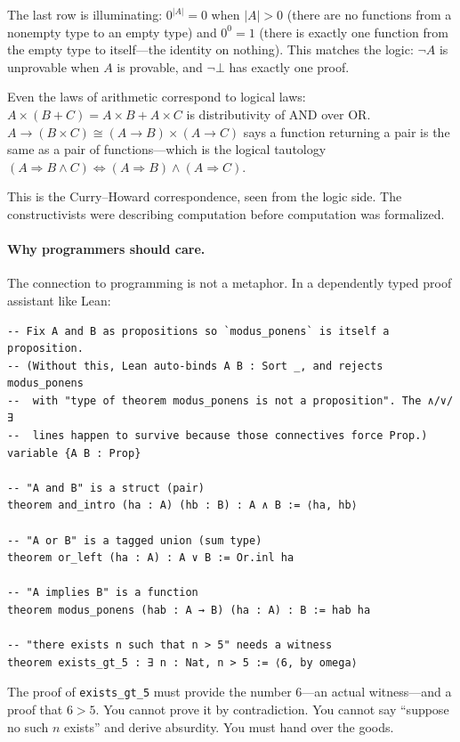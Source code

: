 \documentclass[11pt,a4paper]{article}
\theoremstyle{definition}
\begin{document}
The last row is illuminating: $0^{|A|} = 0$ when $|A| > 0$ (there are no
functions from a nonempty type to an empty type) and $0^0 = 1$ (there is
exactly one function from the empty type to itself---the identity on nothing).
This matches the logic: $\lnot A$ is unprovable when $A$ is provable, and
$\lnot \bot$ has exactly one proof.

Even the laws of arithmetic correspond to logical laws: $A \times (B + C) =
A \times B + A \times C$ is distributivity of AND over OR. $A \to (B \times C)
\cong (A \to B) \times (A \to C)$ says a function returning a pair is the same
as a pair of functions---which is the logical tautology
$(A \Rightarrow B \land C) \Leftrightarrow (A \Rightarrow B) \land
(A \Rightarrow C)$.

This is the Curry--Howard correspondence, seen from the logic side. The
constructivists were describing computation before computation was formalized.

\paragraph{Why programmers should care.}
The connection to programming is not a metaphor. In a dependently typed
proof assistant like Lean:

\begin{verbatim}
-- Fix A and B as propositions so `modus_ponens` is itself a proposition.
-- (Without this, Lean auto-binds A B : Sort _, and rejects modus_ponens
--  with "type of theorem modus_ponens is not a proposition". The ∧/∨/∃
--  lines happen to survive because those connectives force Prop.)
variable {A B : Prop}

-- "A and B" is a struct (pair)
theorem and_intro (ha : A) (hb : B) : A ∧ B := ⟨ha, hb⟩

-- "A or B" is a tagged union (sum type)
theorem or_left (ha : A) : A ∨ B := Or.inl ha

-- "A implies B" is a function
theorem modus_ponens (hab : A → B) (ha : A) : B := hab ha

-- "there exists n such that n > 5" needs a witness
theorem exists_gt_5 : ∃ n : Nat, n > 5 := ⟨6, by omega⟩
\end{verbatim}

The proof of \texttt{exists\_gt\_5} must provide the number $6$---an actual
witness---and a proof that $6 > 5$. You cannot prove it by contradiction. You
cannot say ``suppose no such $n$ exists'' and derive absurdity. You must hand
over the goods.
\end{document}
